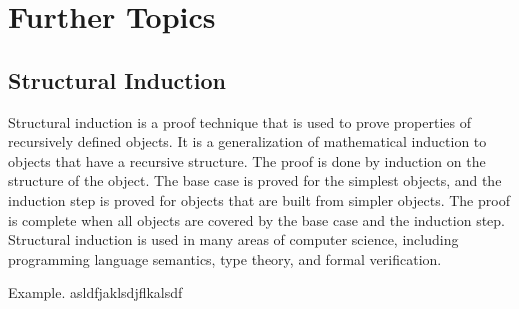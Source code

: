 \section{Further Topics}
\label{sec:further}
\subsection{Structural Induction}
\label{sec:structural}
Structural induction is a proof technique that is used to prove properties of recursively defined objects.
It is a generalization of mathematical induction to objects that have a recursive structure.
The proof is done by induction on the structure of the object.
The base case is proved for the simplest objects, and the induction step is proved for objects that are built from simpler objects.
The proof is complete when all objects are covered by the base case and the induction step.
Structural induction is used in many areas of computer science, including programming language semantics, type theory, and formal verification.
\begin{example}
    Example.
    asldfjaklsdjflkalsdf
\end{example}